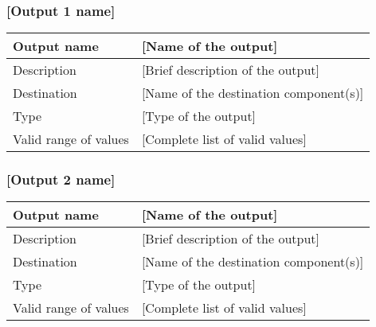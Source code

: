 \subsubsection{[Output 1 name]}

\begin{longtable}{p{}p{}}
\toprule
Output name				& [Name of the output] \\
\midrule
Description				& [Brief description of the output] \\
\midrule
Destination				& [Name of the destination component(s)] \\ 
\midrule
Type						& [Type of the output] \\
\midrule
Valid range of values	& [Complete list of valid values] \\
\bottomrule
\end{longtable}


\subsubsection{[Output 2 name]}

\begin{longtable}{p{}p{}}
\toprule
Output name				& [Name of the output] \\
\midrule
Description				& [Brief description of the output] \\
\midrule
Destination				& [Name of the destination component(s)] \\ 
\midrule
Type						& [Type of the output] \\
\midrule
Valid range of values	& [Complete list of valid values] \\
\bottomrule
\end{longtable}

